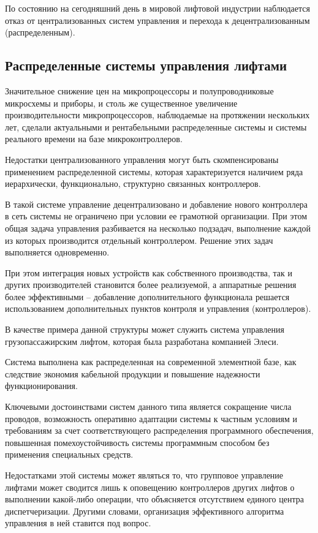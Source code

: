 		По состоянию на сегодняшний день в мировой лифтовой индустрии наблюдается отказ
		от централизованных систем управления и перехода к децентрализованным (распределенным). 

	\subsection{Распределенные системы управления лифтами}

	Значительное снижение цен на микропроцессоры и полупроводниковые микросхемы и приборы,
		и столь же существенное увеличение производительности микропроцессоров,
		наблюдаемые на протяжении нескольких лет, сделали актуальными и рентабельными
		распределенные системы и системы реального времени на базе микроконтроллеров.

	Недостатки централизованного управления могут быть скомпенсированы применением
		распределенной системы, которая характеризуется наличием ряда иерархически,
		функционально, структурно связанных контроллеров.

	В такой системе управление децентрализовано и добавление нового контроллера
		в сеть системы не ограничено при условии ее грамотной организации.
		При этом общая задача управления разбивается на несколько подзадач,
		выполнение каждой из которых производится отдельный контроллером. Решение этих задач выполняется одновременно.

	При этом интеграция новых устройств как собственного производства,
		так и других производителей становится более реализуемой,
		а аппаратные решения более эффективными – добавление дополнительного
		функционала решается использованием дополнительных пунктов контроля и управления (контроллеров).

	В качестве примера данной структуры может служить система управления грузопассажирским лифтом,
		которая была разработана компанией Элеси.

	Система выполнена как распределенная на современной элементной базе,
		как следствие экономия кабельной продукции и повышение надежности функционирования.

	Ключевыми достоинствами систем данного типа является сокращение
		числа проводов, возможность оперативно адаптации системы к частным условиям и требованиям
		за счет соответствующего распределения программного обеспечения,
		повышенная помехоустойчивость системы программным способом без применения специальных средств.

	Недостатками этой системы может являться то,
		что групповое управление лифтами может сводится лишь к оповещению контроллеров
		других лифтов о выполнении какой-либо операции, что объясняется отсутствием
		единого центра диспетчеризации. Другими словами, организация эффективного алгоритма
		управления в ней ставится под вопрос. 

